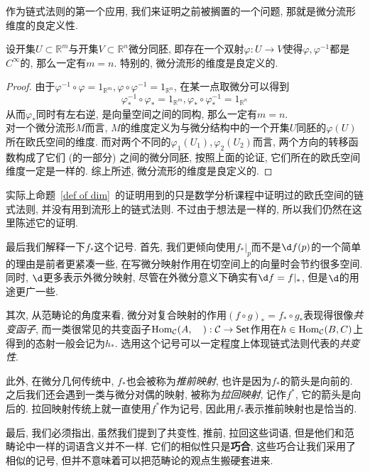 作为链式法则的第一个应用, 我们来证明之前被搁置的一个问题, 那就是微分流形维度的良定义性.
\begin{prop}\label{def of dim}
    设开集$U\subset\mathbb{R}^m$与开集$V\subset\mathbb{R}^n$微分同胚, 即存在一个双射$\varphi:U\to V$使得$\varphi,\varphi^{-1}$都是$C^\infty$的, 那么一定有$m=n$.
    特别的, 微分流形的维度是良定义的.
\end{prop}
\begin{proof}
    由于$\varphi^{-1}\circ\varphi=1_{\mathbb{R}^m},\varphi\circ\varphi^{-1}=1_{\mathbb{R}^n}$, 在某一点取微分可以得到
    \[\varphi^{-1}_*\circ\varphi_*=1_{\mathbb{R}^m},\varphi_*\circ\varphi^{-1}_*=1_{\mathbb{R}^n}\]
    从而$\varphi_*$同时有左右逆, 是向量空间之间的同构, 那么一定有$m=n$.\\
    对一个微分流形$M$而言, $M$的维度定义为与微分结构中的一个开集$U$同胚的$\varphi(U)$所在欧氏空间的维度.
    而对两个不同的$\varphi_1(U_1),\varphi_2(U_2)$而言, 两个方向的转移函数构成了它们 (的一部分) 之间的微分同胚, 按照上面的论证, 它们所在的欧氏空间维度一定是一样的.
    综上所述, 微分流形的维度是良定义的.
\end{proof}

\begin{rem}
    实际上命题~\ref{def of dim}~的证明用到的只是数学分析课程中证明过的欧氏空间的链式法则, 并没有用到流形上的链式法则.
    不过由于想法是一样的, 所以我们仍然在这里陈述它的证明.
\end{rem}

\begin{rem}
    最后我们解释一下$f_*$这个记号.
    首先, 我们更倾向使用$f_*|_p$而不是$\d f(p)$的一个简单的理由是前者更紧凑一些, 在写微分映射作用在切空间上的向量时会节约很多空间.
    同时, $\d$更多表示外微分映射, 尽管在外微分意义下确实有$\d f=f|_*$, 但是$\d$的用途更广一些.

    其次, 从范畴论的角度来看, 微分对复合映射的作用$(f\circ g)_*=f_*\circ g_*$表现得很像\textit{共变函子}, 而一类很常见的共变函子$\operatorname{Hom}_{\mathcal{C}}(A,\quad):\mathcal{C}\to\mathsf{Set}$作用在$h\in\operatorname{Hom}_{\mathcal{C}}(B,C)$上得到的态射一般会记为$h_*$.
    选用这个记号可以一定程度上体现链式法则代表的\textit{共变性}.

    此外, 在微分几何传统中, $f_*$也会被称为\textit{推前映射}, 也许是因为$f_*$的箭头是向前的.
    之后我们还会遇到一类与微分对偶的映射, 被称为\textit{拉回映射}, 记作$f^*$, 它的箭头是向后的.
    拉回映射传统上就一直使用$f^*$作为记号, 因此用$f_*$表示推前映射也是恰当的.  

    最后, 我们必须指出, 虽然我们提到了共变性, 推前, 拉回这些词语, 但是他们和范畴论中一样的词语含义并不一样.
    它们的相似性只是\textbf{巧合}, 这些巧合让我们采用了相似的记号, 但并不意味着可以把范畴论的观点生搬硬套进来.
\end{rem}

